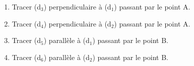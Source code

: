 \documentclass[exercice]{thedocument}%
\begin{document}
%
\begin{enumerate}
    \item Tracer (d$_3$) perpendiculaire à (d$_1$) passant
    par le point A.
    \item Tracer (d$_4$) perpendiculaire à (d$_2$) passant par le point A.
    \item Tracer (d$_5$) parallèle à (d$_1$) passant
    par le point B.
    \item Tracer (d$_6$) parallèle à (d$_2$) passant
    par le point B.
\end{enumerate}
\begin{center}
\end{center}
\end{document}

